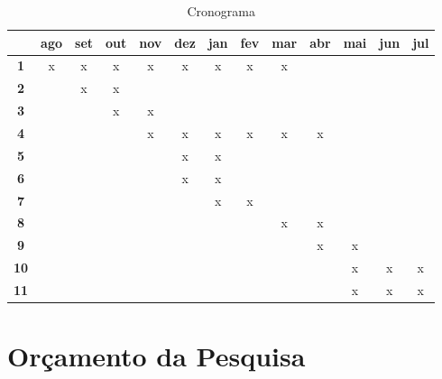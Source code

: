\documentclass[
	12pt,				%
	openany,
	oneside,
	a4paper,			%
	english,			%
	brazil,				%
	]{abntex2}
\begin{document}
\begin{table}[H]
	\caption{Cronograma}
	\centering
	\begin{tabular}{|c||c|c|c|c|c|c|c|c|c|c|c|c|}
		\hline
		&ago&set&out&nov&dez&jan&fev&mar&abr&mai&jun&jul\\
		\hline\hline
		\textbf{1}  & x & x & x & x & x & x & x & x &   &   &   &   \\ %
		\textbf{2}  &   & x & x &   &   &   &   &   &   &   &   &   \\ %
		\textbf{3}  &   &   & x & x &   &   &   &   &   &   &   &   \\ %
		\textbf{4}  &   &   &   & x & x & x & x & x & x &   &   &   \\ %
		\textbf{5}  &   &   &   &   & x & x &   &   &   &   &   &   \\ %
		\textbf{6}  &   &   &   &   & x & x &   &   &   &   &   &   \\ %
		\textbf{7}  &   &   &   &   &   & x & x &   &   &   &   &   \\ %
		\textbf{8}  &   &   &   &   &   &   &   & x & x &   &   &   \\ %
		\textbf{9}  &   &   &   &   &   &   &   &   & x & x &   &   \\ %
		\textbf{10} &   &   &   &   &   &   &   &   &   & x & x & x \\ %
		\textbf{11} &   &   &   &   &   &   &   &   &   & x & x & x \\ %
		\hline
	\end{tabular}
	\label{tableSS}
\end{table}



\chapter{Orçamento da Pesquisa}



\end{document}
